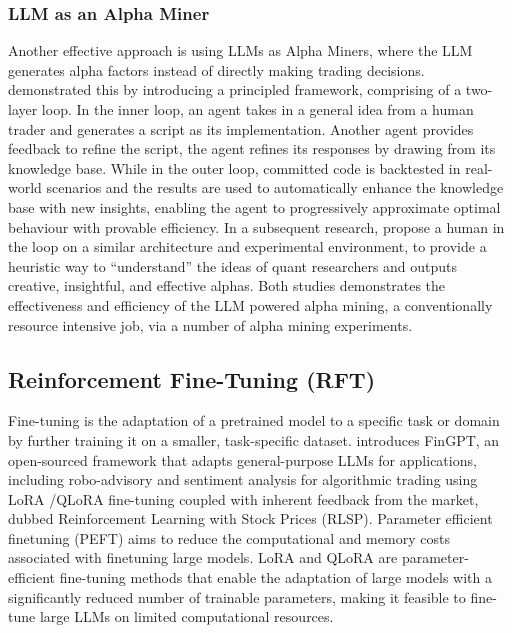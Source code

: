 \documentclass[conference]{IEEEtran}
\begin{document}
\subsubsection{LLM as an Alpha Miner}
\label{sec:llm-alphaminer}

Another effective approach is using LLMs as Alpha Miners, where the LLM generates alpha factors instead of directly making trading decisions.
\cite{wang2024quantagent} demonstrated this by introducing a principled framework, comprising of a two-layer loop. In the inner loop,
an agent takes in a general idea from a human trader and generates a script as its implementation.
Another agent provides feedback to refine the script, the agent refines its responses by drawing from its knowledge base.
While in the outer loop, committed code is backtested in real-world scenarios and the results are used to automatically enhance the knowledge base with new insights,
enabling the agent to progressively approximate optimal behaviour with provable efficiency. In a subsequent research,
\cite{wang2023alphagpt} propose a human in the loop on a similar architecture and experimental environment,
to provide a heuristic way to ``understand'' the ideas of quant researchers and outputs creative, insightful, and effective alphas.
Both studies demonstrates the effectiveness and efficiency of the LLM powered alpha mining, a conventionally resource intensive job,
via a number of alpha mining experiments.

\subsection{Reinforcement Fine-Tuning (RFT)}
\label{sec:rft}

Fine-tuning is the adaptation of a pretrained model to a specific task or domain by further training it on a smaller, task-specific dataset.
\cite{liu2023fingpt} introduces FinGPT, an open-sourced framework that adapts general-purpose LLMs for applications,
including robo-advisory and sentiment analysis for algorithmic trading using LoRA \cite{hu2021lora}/QLoRA \cite{dettmers2023qlora} fine-tuning coupled
with inherent feedback from the market, dubbed Reinforcement Learning with Stock Prices (RLSP).
Parameter efficient finetuning (PEFT) aims to reduce the computational and memory costs
associated with finetuning large models.
LoRA \cite{hu2021lora} and QLoRA \cite{dettmers2023qlora} are parameter-efficient fine-tuning methods that enable the adaptation of large models with a significantly reduced number of trainable parameters,
making it feasible to fine-tune large LLMs on limited computational resources.
\end{document}
